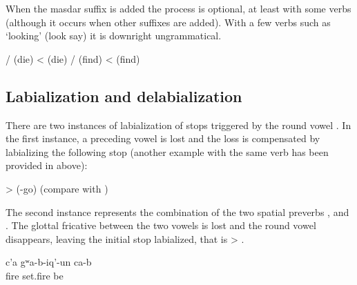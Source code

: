 When the masdar suffix is added the process is optional, at least with some verbs  (although it occurs when other suffixes are added). With a few verbs such as  `looking' (look say) it is downright ungrammatical.
%
\begin{exe}
	\ex	\label{ex:masdar palatalization phon}
	\begin{xlist}
		\ex	{}\slash{} (die) <  (die) 
		\ex	{}\slash{} (find) <  (find)
	\end{xlist}
\end{exe}



\subsection{Labialization and delabialization}
\label{ssec:Labialization and delabialization}

There are two instances of labialization of stops triggered by the round vowel . In the first instance, a preceding vowel is lost and the loss is compensated by labializing the following stop (another example with the same verb has been provided in  above):
%
\begin{exe} \label{ex:insidephon2}
	\ex	{} >  \newline\hspace*{2em}(-go) (compare with )
\end{exe}

The second instance represents the combination of the two spatial preverbs  ,  and  . The glottal fricative between the two vowels is lost and the round vowel disappears, leaving the initial stop labialized, that is  >  .
%
\begin{exe}
	\ex	\label{ex:She set up a phon}
	\gll	c'a	gʷa-b-iq'-un	ca-b\\
		fire	set.fire	be\\
	\glt	{}
\end{exe}

